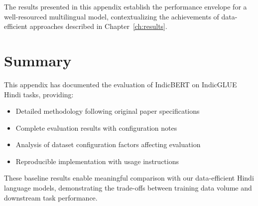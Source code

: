 The results presented in this appendix establish the performance envelope for a well-resourced multilingual model, contextualizing the achievements of data-efficient approaches described in Chapter~\ref{ch:results}.

\section{Summary}

This appendix has documented the evaluation of IndicBERT on IndicGLUE Hindi tasks, providing:
\begin{itemize}
    \item Detailed methodology following original paper specifications
    \item Complete evaluation results with configuration notes
    \item Analysis of dataset configuration factors affecting evaluation
    \item Reproducible implementation with usage instructions
\end{itemize}

These baseline results enable meaningful comparison with our data-efficient Hindi language models, demonstrating the trade-offs between training data volume and downstream task performance.
